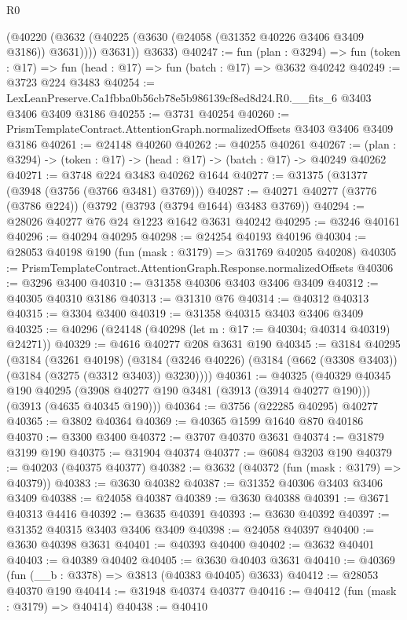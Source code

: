 \begin{lexlean}{R0}
\begin{coremodule}
          (@40220 (@3632 (@40225 (@3630 (@24058 (@31352 @40226 @3406 @3409 @3186)) @3631))))
          @3631))
      @3633)
@40247 := fun (plan : @3294) =>
  fun (token : @17) => fun (head : @17) => fun (batch : @17) => @3632 @40242
@40249 := @3723 @224 @3483
@40254 := LexLeanPreserve.Ca1fbba0b56cb78e5b986139cf8ed8d24.R0.__fits_6 @3403 @3406 @3409 @3186
@40255 := @3731 @40254
@40260 := PrismTemplateContract.AttentionGraph.normalizedOffsets @3403 @3406 @3409 @3186
@40261 := @24148 @40260
@40262 := @40255 @40261
@40267 := (plan : @3294) -> (token : @17) -> (head : @17) -> (batch : @17) -> @40249 @40262
@40271 := @3748 @224 @3483 @40262 @1644
@40277 := @31375 (@31377 (@3948 (@3756 (@3766 @3481) @3769)))
@40287 := @40271 @40277 (@3776 (@3786 @224)) (@3792 (@3793 (@3794 @1644) @3483 @3769))
@40294 := @28026 @40277 @76 @24 @1223 @1642 @3631 @40242
@40295 := @3246 @40161
@40296 := @40294 @40295
@40298 := @24254 @40193 @40196
@40304 := @28053 @40198 @190 (fun (mask : @3179) => @31769 @40205 @40208)
@40305 := PrismTemplateContract.AttentionGraph.Response.normalizedOffsets
@40306 := @3296 @3400
@40310 := @31358 @40306 @3403 @3406 @3409
@40312 := @40305 @40310 @3186
@40313 := @31310 @76
@40314 := @40312 @40313
@40315 := @3304 @3400
@40319 := @31358 @40315 @3403 @3406 @3409
@40325 := @40296 (@24148 (@40298 (let m : @17 := @40304; @40314 @40319) @24271))
@40329 := @4616 @40277 @208 @3631 @190
@40345 := @3184
    @40295
    (@3184
      (@3261 @40198)
      (@3184 (@3246 @40226) (@3184 (@662 (@3308 @3403)) (@3184 (@3275 (@3312 @3403)) @3230))))
@40361 := @40325
    (@40329
      @40345
      @190
      @40295
      (@3908 @40277 @190 @3481 (@3913 (@3914 @40277 @190)))
      (@3913 (@4635 @40345 @190)))
@40364 := @3756 (@22285 @40295) @40277
@40365 := @3802 @40364
@40369 := @40365 @1599 @1640 @870 @40186
@40370 := @3300 @3400
@40372 := @3707 @40370 @3631
@40374 := @31879 @3199 @190
@40375 := @31904 @40374
@40377 := @6084 @3203 @190
@40379 := @40203 (@40375 @40377)
@40382 := @3632 (@40372 (fun (mask : @3179) => @40379))
@40383 := @3630 @40382
@40387 := @31352 @40306 @3403 @3406 @3409
@40388 := @24058 @40387
@40389 := @3630 @40388
@40391 := @3671 @40313 @4416
@40392 := @3635 @40391
@40393 := @3630 @40392
@40397 := @31352 @40315 @3403 @3406 @3409
@40398 := @24058 @40397
@40400 := @3630 @40398 @3631
@40401 := @40393 @40400
@40402 := @3632 @40401
@40403 := @40389 @40402
@40405 := @3630 @40403 @3631
@40410 := @40369 (fun (__b : @3378) => @3813 (@40383 @40405) @3633)
@40412 := @28053 @40370 @190
@40414 := @31948 @40374 @40377
@40416 := @40412 (fun (mask : @3179) => @40414)
@40438 := @40410

\end{coremodule}
\end{lexlean}
